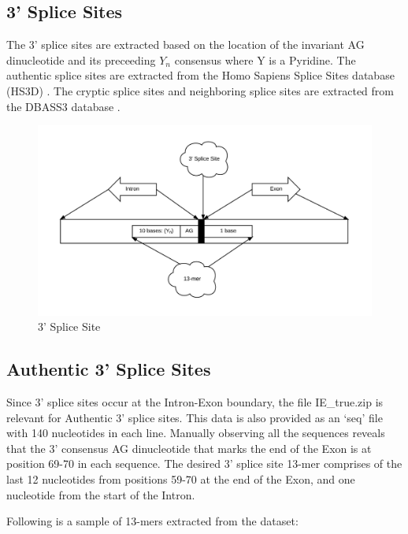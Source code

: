 \documentclass[12pt,a4paper]{article}
\begin{document}
	\subsection{3' Splice Sites}
	The 3’ splice sites are extracted based on the location of the invariant AG dinucleotide and its preceeding $Y_n$ consensus where Y is a Pyridine. The authentic splice sites are extracted from the Homo Sapiens Splice Sites database (HS3D) \cite{hs3d-1,hs3d-2}. The cryptic splice sites and neighboring splice sites are extracted from the DBASS3 database \cite{dbass-0,dbass-1,dbass-2}.
   	\begin{figure}[H]
   		\includegraphics[width=\textwidth]{"threeprime"}
   		\caption{3' Splice Site}
   		\centering
   	\end{figure}

	\subsection{Authentic 3' Splice Sites}
	Since 3’ splice sites occur at the Intron-Exon boundary, the file IE\_true.zip is relevant for Authentic 3’ splice sites. This data is also provided as an ‘seq’ file with 140 nucleotides in each line. Manually observing all the sequences reveals that the 3’ consensus AG dinucleotide that marks the end of the Exon is at position 69-70 in each sequence. The desired 3’ splice site 13-mer comprises of the last 12 nucleotides from positions 59-70 at the end of the Exon, and one nucleotide from the start of the Intron. \par
	Following is a sample of 13-mers extracted from the dataset:
\end{document}
